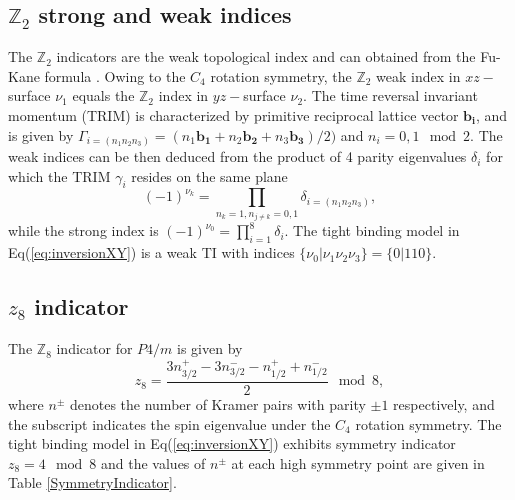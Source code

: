 \subsection{$\mathbb{Z}_2$ strong and weak indices}

The $\mathbb{Z}_2$ indicators are the weak topological index and can obtained from the Fu-Kane formula \cite{Fu_Kane_07}. Owing to the $C_4$ rotation symmetry, the $\mathbb{Z}_2$ weak index in $xz-$surface $\nu_1$ equals the $\mathbb{Z}_2$ index in $yz-$surface $\nu_2$. The time reversal invariant momentum (TRIM) is characterized by primitive reciprocal lattice vector $\mathbf{b_i}$, and is given by $\Gamma_{i = (n_1 n_2 n_3)} = (n_1 \mathbf{b_1} + n_2 \mathbf{b_2} + n_3 \mathbf{b_3})/2)$ and $n_i = 0, 1 \mod 2$. The weak indices can be then deduced from the product of 4 parity eigenvalues $\delta_i$ for which the TRIM $\gamma_i$ resides on the same plane
\begin{equation}
    (-1)^{\nu_{k}} = \prod_{n_k = 1, n_{j \neq k} = 0, 1 } \delta_{i = ( n_1 n_2 n_3 )} ,
\end{equation}
while the strong index is $(-1)^{\nu_0} = \prod_{i=1}^8 \delta_i$. The tight binding model in Eq(\ref{eq:inversionXY}) is a weak TI with indices $\{\nu_0 | \nu_1 \nu_2 \nu_3 \} = \{0 | 110\}$.

\subsection{$z_8$ indicator}

The $\mathbb{Z}_8$ indicator for $P4/m$ is given by
\begin{equation}\label{eq:z8}
    z_8 = \frac{3 n_{3/2}^+ - 3 n_{3/2}^- - n_{1/2}^+ + n_{1/2}^-}{2} \mod 8 ,
\end{equation}
where $n^{\pm}$ denotes the number of Kramer pairs with parity $\pm 1$ respectively, and the subscript indicates the spin eigenvalue under the $C_4$ rotation symmetry. The tight binding model in Eq(\ref{eq:inversionXY}) exhibits symmetry indicator $z_8 = 4 \mod 8$ and the values of $n^{\pm}$ at each high symmetry point are given in Table \ref{SymmetryIndicator}. %

